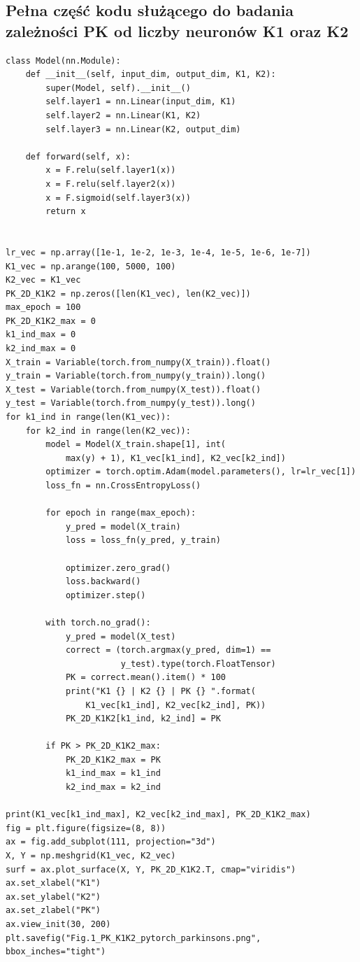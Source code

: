 \documentclass{article}
\begin{document}
\subsection{Pełna część kodu służącego do badania zależności PK od liczby neuronów K1 oraz K2}
\begin{verbatim}
class Model(nn.Module):
    def __init__(self, input_dim, output_dim, K1, K2):
        super(Model, self).__init__()
        self.layer1 = nn.Linear(input_dim, K1)
        self.layer2 = nn.Linear(K1, K2)
        self.layer3 = nn.Linear(K2, output_dim)

    def forward(self, x):
        x = F.relu(self.layer1(x))
        x = F.relu(self.layer2(x))
        x = F.sigmoid(self.layer3(x))
        return x


lr_vec = np.array([1e-1, 1e-2, 1e-3, 1e-4, 1e-5, 1e-6, 1e-7])
K1_vec = np.arange(100, 5000, 100)
K2_vec = K1_vec
PK_2D_K1K2 = np.zeros([len(K1_vec), len(K2_vec)])
max_epoch = 100
PK_2D_K1K2_max = 0
k1_ind_max = 0
k2_ind_max = 0
X_train = Variable(torch.from_numpy(X_train)).float()
y_train = Variable(torch.from_numpy(y_train)).long()
X_test = Variable(torch.from_numpy(X_test)).float()
y_test = Variable(torch.from_numpy(y_test)).long()
for k1_ind in range(len(K1_vec)):
    for k2_ind in range(len(K2_vec)):
        model = Model(X_train.shape[1], int(
            max(y) + 1), K1_vec[k1_ind], K2_vec[k2_ind])
        optimizer = torch.optim.Adam(model.parameters(), lr=lr_vec[1])
        loss_fn = nn.CrossEntropyLoss()

        for epoch in range(max_epoch):
            y_pred = model(X_train)
            loss = loss_fn(y_pred, y_train)

            optimizer.zero_grad()
            loss.backward()
            optimizer.step()

        with torch.no_grad():
            y_pred = model(X_test)
            correct = (torch.argmax(y_pred, dim=1) ==
                       y_test).type(torch.FloatTensor)
            PK = correct.mean().item() * 100
            print("K1 {} | K2 {} | PK {} ".format(
                K1_vec[k1_ind], K2_vec[k2_ind], PK))
            PK_2D_K1K2[k1_ind, k2_ind] = PK

        if PK > PK_2D_K1K2_max:
            PK_2D_K1K2_max = PK
            k1_ind_max = k1_ind
            k2_ind_max = k2_ind

print(K1_vec[k1_ind_max], K2_vec[k2_ind_max], PK_2D_K1K2_max)
fig = plt.figure(figsize=(8, 8))
ax = fig.add_subplot(111, projection="3d")
X, Y = np.meshgrid(K1_vec, K2_vec)
surf = ax.plot_surface(X, Y, PK_2D_K1K2.T, cmap="viridis")
ax.set_xlabel("K1")
ax.set_ylabel("K2")
ax.set_zlabel("PK")
ax.view_init(30, 200)
plt.savefig("Fig.1_PK_K1K2_pytorch_parkinsons.png", bbox_inches="tight")
\end{verbatim}
\end{document}

